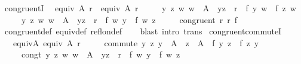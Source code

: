 \begin{isabellebody}
\isamarkupfalse%
\ congruent{}I{\isacharcolon}{\kern0pt}\isanewline
\ \ {\isachardoublequoteopen}equiv\ A{}\ r{}\ {\isasymLongrightarrow}\ equiv\ A{}\ r{}\isanewline
\ \ \ \ {\isasymLongrightarrow}\ {\isacharparenleft}{\kern0pt}{\isasymAnd}y\ z\ w{\isachardot}{\kern0pt}\ w\ {\isasymin}\ A{}\ {\isasymLongrightarrow}\ {\isacharparenleft}{\kern0pt}y{\isacharcomma}{\kern0pt}z{\isacharparenright}{\kern0pt}\ {\isasymin}\ r{}\ {\isasymLongrightarrow}\ f\ y\ w\ {\isacharequal}{\kern0pt}\ f\ z\ w{\isacharparenright}{\kern0pt}\isanewline
\ \ \ \ {\isasymLongrightarrow}\ {\isacharparenleft}{\kern0pt}{\isasymAnd}y\ z\ w{\isachardot}{\kern0pt}\ w\ {\isasymin}\ A{}\ {\isasymLongrightarrow}\ {\isacharparenleft}{\kern0pt}y{\isacharcomma}{\kern0pt}z{\isacharparenright}{\kern0pt}\ {\isasymin}\ r{}\ {\isasymLongrightarrow}\ f\ w\ y\ {\isacharequal}{\kern0pt}\ f\ w\ z{\isacharparenright}{\kern0pt}\isanewline
\ \ \ \ {\isasymLongrightarrow}\ congruent{}\ r{}\ r{}\ f{\isachardoublequoteclose}\isanewline
\ \ %
\isanewline
\ \ %
\isanewline
%
\isadelimproof
\ \ %
\endisadelimproof
%
\isatagproof
{}\isamarkupfalse%
\ congruent{}{\isacharunderscore}{\kern0pt}def\ equiv{\isacharunderscore}{\kern0pt}def\ refl{\isacharunderscore}{\kern0pt}on{\isacharunderscore}{\kern0pt}def\isanewline
\ \ \isamarkupfalse%
\ {\isacharparenleft}{\kern0pt}blast\ intro{\isacharcolon}{\kern0pt}\ trans{\isacharparenright}{\kern0pt}%
\endisatagproof
{\isafoldproof}%
%
\isadelimproof
\isanewline
%
\endisadelimproof
\isanewline
{}\isamarkupfalse%
\ congruent{}{\isacharunderscore}{\kern0pt}commuteI{\isacharcolon}{\kern0pt}\isanewline
\ \ \ equivA{\isacharcolon}{\kern0pt}\ {\isachardoublequoteopen}equiv\ A\ r{\isachardoublequoteclose}\isanewline
\ \ \ \ \ commute{\isacharcolon}{\kern0pt}\ {\isachardoublequoteopen}{\isasymAnd}y\ z{\isachardot}{\kern0pt}\ y\ {\isasymin}\ A\ {\isasymLongrightarrow}\ z\ {\isasymin}\ A\ {\isasymLongrightarrow}\ f\ y\ z\ {\isacharequal}{\kern0pt}\ f\ z\ y{\isachardoublequoteclose}\isanewline
\ \ \ \ \ congt{\isacharcolon}{\kern0pt}\ {\isachardoublequoteopen}{\isasymAnd}y\ z\ w{\isachardot}{\kern0pt}\ w\ {\isasymin}\ A\ {\isasymLongrightarrow}\ {\isacharparenleft}{\kern0pt}y{\isacharcomma}{\kern0pt}z{\isacharparenright}{\kern0pt}\ {\isasymin}\ r\ {\isasymLongrightarrow}\ f\ w\ y\ {\isacharequal}{\kern0pt}\ f\ w\ z{\isachardoublequoteclose}\isanewline

\end{isabellebody}
